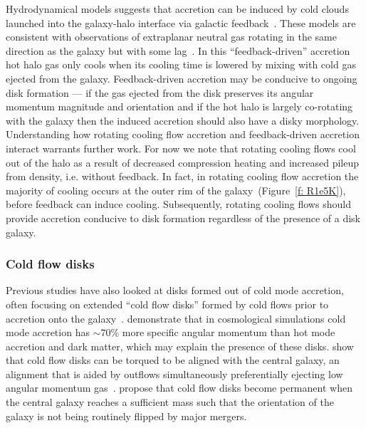 \documentclass[fleqn,usenatbib]{mnras}
\begin{document}
Hydrodynamical models suggests that accretion can be induced by cold clouds launched into the galaxy-halo interface via galactic feedback~\citep[e.g.][]{Marinacci2010, Marinacci2011, Marinacci2012, Armillotta2016a, Fraternali2017, Hobbs2020}.
These models are consistent with observations of extraplanar neutral gas rotating in the same direction as the galaxy but with some lag~\citep[e.g.][]{Fraternali2008,  Marasco2012}.
In this ``feedback-driven'' accretion hot halo gas only cools when its cooling time is lowered by mixing with cold gas ejected from the galaxy.
Feedback-driven accretion may be conducive to ongoing disk formation --- if the gas ejected from the disk preserves its angular momentum magnitude and orientation and if the hot halo is largely co-rotating with the galaxy then the induced accretion should also have a disky morphology.
Understanding how rotating cooling flow accretion and feedback-driven accretion interact warrants further work.
For now we note that rotating cooling flows cool out of the halo as a result of decreased compression heating and increased pileup from density, i.e. without feedback.
In fact, in rotating cooling flow accretion the majority of cooling occurs at the outer rim of the galaxy~(Figure~\ref{f: R1e5K}), before feedback can induce cooling.
Subsequently, rotating cooling flows should provide accretion conducive to disk formation regardless of the presence of a disk galaxy.

\subsubsection{Cold flow disks}
\label{s: other disk formation -- feedback-driven}

Previous studies have also looked at disks formed out of cold mode accretion, often focusing on extended ``cold flow disks'' formed by cold flows prior to accretion onto the galaxy~\citep[e.g.][]{Stewart2011a}.
\cite{Stewart2013} demonstrate that in cosmological simulations cold mode accretion has $\sim 70\%$ more specific angular momentum than hot mode accretion and dark matter, which may explain the presence of these disks.
\cite{Danovich2015} show that cold flow disks can be torqued to be aligned with the central galaxy, an alignment that is aided by outflows simultaneously preferentially ejecting low angular momentum gas~\citep[e.g.][]{Ubler2014}.
\cite{Dekel2020a} propose that cold flow disks become permanent when the central galaxy reaches a sufficient mass such that the orientation of the galaxy is not being routinely flipped by major mergers.
\end{document}
